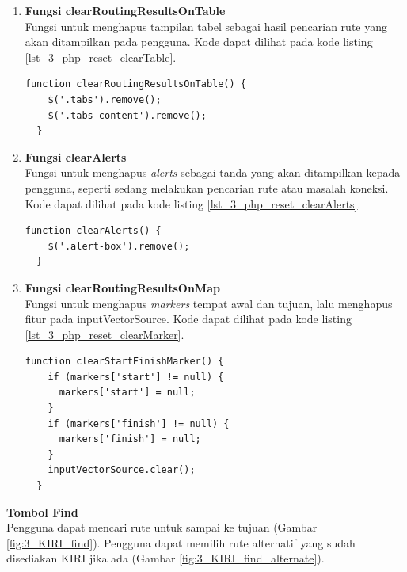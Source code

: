 \documentclass[a4paper,twoside]{article}
\begin{document}
\begin{enumerate}
\begin{enumerate}
  \item \textbf{Fungsi clearRoutingResultsOnTable}\\
  Fungsi untuk menghapus tampilan tabel sebagai hasil pencarian rute yang akan ditampilkan pada pengguna. Kode dapat dilihat pada kode listing \ref{lst_3_php_reset_clearTable}.
  
  \begin{lstlisting}[caption=Fungsi JavaScript untuk menghapus tampilan tabel,label = {lst_3_php_reset_clearTable}]
  function clearRoutingResultsOnTable() {
    $('.tabs').remove();
    $('.tabs-content').remove();
  }
  \end{lstlisting}
  
  \item \textbf{Fungsi clearAlerts}\\
  Fungsi untuk menghapus \textit{alerts} sebagai tanda yang akan ditampilkan kepada pengguna, seperti sedang melakukan pencarian rute atau masalah koneksi. Kode dapat dilihat pada kode listing \ref{lst_3_php_reset_clearAlerts}.
  
  \begin{lstlisting}[caption=Fungsi JavaScript untuk menghilangkan \textit{alerts},label = {lst_3_php_reset_clearAlerts}]
  function clearAlerts() {
    $('.alert-box').remove();
  }
  \end{lstlisting}
  
  \item \textbf{Fungsi clearRoutingResultsOnMap}\\
  Fungsi untuk menghapus \textit{markers} tempat awal dan tujuan, lalu menghapus fitur pada inputVectorSource. Kode dapat dilihat pada kode listing \ref{lst_3_php_reset_clearMarker}.
  
  \begin{lstlisting}[caption=Fungsi JavaScript untuk menghilangkan \textit{alerts},label = {lst_3_php_reset_clearMarker}]
  function clearStartFinishMarker() {
    if (markers['start'] != null) {
      markers['start'] = null;
    }
    if (markers['finish'] != null) {
      markers['finish'] = null;
    }
    inputVectorSource.clear();
  }
  \end{lstlisting}
  
\end{enumerate}

\textbf{Tombol Find}\\
Pengguna dapat mencari rute untuk sampai ke tujuan (Gambar \ref{fig:3_KIRI_find}). Pengguna dapat memilih rute alternatif yang sudah disediakan KIRI jika ada (Gambar \ref{fig:3_KIRI_find_alternate}).


\end{enumerate}
\end{document}
